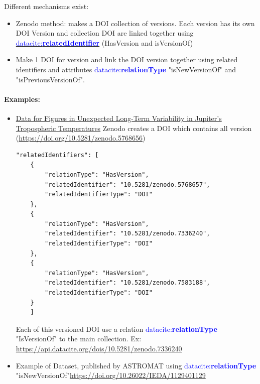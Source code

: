 \documentclass[11pt,a4paper]{ivoa}
\newcommand{\datacitedocurl}{https://datacite-metadata-schema.readthedocs.io/en/4.6}
\newcommand{\datacitepropurl}[1]{\datacitedocurl/properties/#1}
\newcommand{\dataciteterm}[1]{\textcolor{blue}{\mbox{datacite:\textbf{#1}}}}
\newcommand{\datacitetag}[2]{\href{\datacitepropurl{#1}}{\textcolor{blue}{\mbox{datacite:\textbf{#2}}}}}
\begin{document}
Different mechanisms exist:

\begin{itemize}
\item{} Zenodo method: makes a DOI collection of versions. Each version has its own DOI\newline
Version and collection DOI are linked together using \datacitetag{relatedidentifier}{relatedIdentifier} (HasVersion and isVersionOf)
\item{} Make 1 DOI for version and link the DOI version together using related identifiers and attributes \dataciteterm{relationType} "isNewVersionOf" and "isPreviousVersionOf".
\end{itemize}

\paragraph{Examples:}

\begin{itemize}
\item{} \href{https://doi.org/10.5281/zenodo.5768656}{Data for Figures in Unexpected Long-Term Variability in Jupiter's Tropospheric Temperatures}\newline
  Zenodo creates a DOI which contains all version (\url{https://doi.org/10.5281/zenodo.5768656})\newline
  
  \begin{lstlisting}[basicstyle=\footnotesize\ttfamily]
  "relatedIdentifiers": [
  	{
  		"relationType": "HasVersion",
  		"relatedIdentifier": "10.5281/zenodo.5768657",
  		"relatedIdentifierType": "DOI"
  	},
  	{
  		"relationType": "HasVersion",
  		"relatedIdentifier": "10.5281/zenodo.7336240",
  		"relatedIdentifierType": "DOI"
  	},
  	{
  		"relationType": "HasVersion",
  		"relatedIdentifier": "10.5281/zenodo.7583188",
  		"relatedIdentifierType": "DOI"
  	}
  	]
  \end{lstlisting}

Each of this versioned DOI use a relation \dataciteterm{relationType} "IsVersionOf" to the main collection. \newline
Ex: \url{https://api.datacite.org/dois/10.5281/zenodo.7336240}


\item{} Example of Dataset, published by ASTROMAT using \dataciteterm{relationType} "isNewVersionOf"\newline \url{https://doi.org/10.26022/IEDA/1129401129}
\end{itemize}
\end{document}
